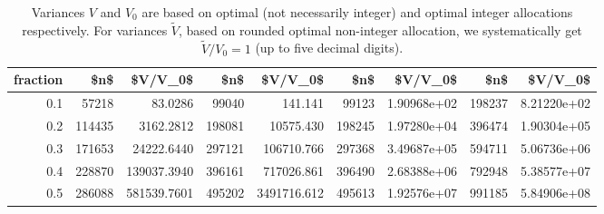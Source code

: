 \begin{table}

\caption{\label{tab:}
\footnotesize Variances $V$ and $V_0$ are based on optimal (not necessarily integer)
and optimal integer allocations respectively.
For variances $\tilde{V}$, based on rounded optimal non-integer allocation,
we systematically get $\tilde{V}/V_0=1$ (up to five decimal digits).}
\centering
\begin{tabular}[t]{r|r|r|r|r|r|r|r|r}
\hline
fraction & \$n\$ & \$V/V\_0\$ & \$n\$ & \$V/V\_0\$ & \$n\$ & \$V/V\_0\$ & \$n\$ & \$V/V\_0\$\\
\hline
0.1 & 57218 & 83.0286 & 99040 & 141.141 & 99123 & 1.90968e+02 & 198237 & 8.21220e+02\\
\hline
0.2 & 114435 & 3162.2812 & 198081 & 10575.430 & 198245 & 1.97280e+04 & 396474 & 1.90304e+05\\
\hline
0.3 & 171653 & 24222.6440 & 297121 & 106710.766 & 297368 & 3.49687e+05 & 594711 & 5.06736e+06\\
\hline
0.4 & 228870 & 139037.3940 & 396161 & 717026.861 & 396490 & 2.68388e+06 & 792948 & 5.38577e+07\\
\hline
0.5 & 286088 & 581539.7601 & 495202 & 3491716.612 & 495613 & 1.92576e+07 & 991185 & 5.84906e+08\\
\hline
\end{tabular}
\end{table}